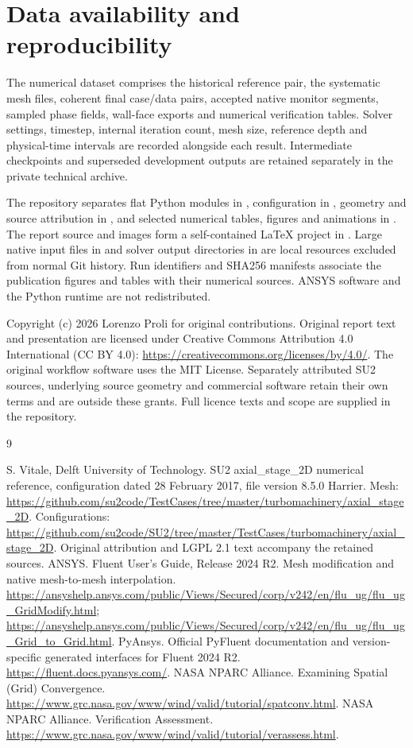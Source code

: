 \documentclass[11pt,a4paper]{article}
\begin{document}
\section{Data availability and reproducibility}
The numerical dataset comprises the historical reference pair, the systematic mesh files, coherent final case/data pairs, accepted native monitor segments, sampled phase fields, wall-face exports and numerical verification tables. Solver settings, timestep, internal iteration count, mesh size, reference depth and physical-time intervals are recorded alongside each result. Intermediate checkpoints and superseded development outputs are retained separately in the private technical archive.\par
The repository separates flat Python modules in , configuration in , geometry and source attribution in , and selected numerical tables, figures and animations in . The report source and images form a self-contained LaTeX project in . Large native input files in  and solver output directories in  are local resources excluded from normal Git history. Run identifiers and SHA256 manifests associate the publication figures and tables with their numerical sources. ANSYS software and the Python runtime are not redistributed.\par
\par
Copyright (c) 2026 Lorenzo Proli for original contributions. Original report text and presentation are licensed under Creative Commons Attribution 4.0 International (CC BY 4.0): \url{https://creativecommons.org/licenses/by/4.0/}. The original workflow software uses the MIT License. Separately attributed SU2 sources, underlying source geometry and commercial software retain their own terms and are outside these grants. Full licence texts and scope are supplied in the repository.\par
\FloatBarrier
\begin{thebibliography}{9}
 S. Vitale, Delft University of Technology. SU2 axial\_stage\_2D numerical reference, configuration dated 28 February 2017, file version 8.5.0 Harrier. Mesh: \url{https://github.com/su2code/TestCases/tree/master/turbomachinery/axial_stage_2D}. Configurations: \url{https://github.com/su2code/SU2/tree/master/TestCases/turbomachinery/axial_stage_2D}. Original attribution and LGPL 2.1 text accompany the retained sources.
 ANSYS. Fluent User's Guide, Release 2024 R2. Mesh modification and native mesh-to-mesh interpolation. \url{https://ansyshelp.ansys.com/public/Views/Secured/corp/v242/en/flu_ug/flu_ug_GridModify.html}; \url{https://ansyshelp.ansys.com/public/Views/Secured/corp/v242/en/flu_ug/flu_ug_Grid_to_Grid.html}.
 PyAnsys. Official PyFluent documentation and version-specific generated interfaces for Fluent 2024 R2. \url{https://fluent.docs.pyansys.com/}.
 NASA NPARC Alliance. Examining Spatial (Grid) Convergence. \url{https://www.grc.nasa.gov/www/wind/valid/tutorial/spatconv.html}.
 NASA NPARC Alliance. Verification Assessment. \url{https://www.grc.nasa.gov/www/wind/valid/tutorial/verassess.html}.
\end{thebibliography}
\end{document}
